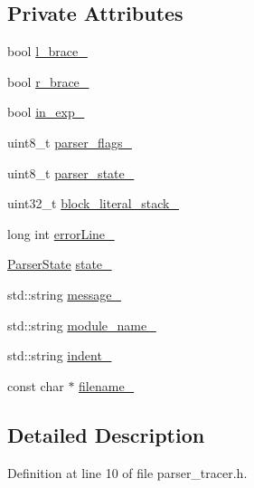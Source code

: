 \subsection*{Private Attributes}
\begin{DoxyCompactItemize}
\item 
bool \hyperlink{classmocha_1_1_parser_tracer_aff95ee8b66288b929029026324959be4}{l\_\-brace\_\-}
\item 
bool \hyperlink{classmocha_1_1_parser_tracer_a68ddbc5b5c22bd599d86ad7e82598a8d}{r\_\-brace\_\-}
\item 
bool \hyperlink{classmocha_1_1_parser_tracer_ab3d8cd46853e02d0318b932a4d2e271a}{in\_\-exp\_\-}
\item 
uint8\_\-t \hyperlink{classmocha_1_1_parser_tracer_a2b47370146eb41cae42152a5aec44aa9}{parser\_\-flags\_\-}
\item 
uint8\_\-t \hyperlink{classmocha_1_1_parser_tracer_a114c5f058d10f88c349347528ba60bfe}{parser\_\-state\_\-}
\item 
uint32\_\-t \hyperlink{classmocha_1_1_parser_tracer_a54822e9954907f16d56078e0339436fa}{block\_\-literal\_\-stack\_\-}
\item 
long int \hyperlink{classmocha_1_1_parser_tracer_a0d4c2ee1918d1e59ce45779853e462e5}{errorLine\_\-}
\item 
\hyperlink{classmocha_1_1_parser_tracer_afe3c94bff7f4cd17fd2f457f92fcf713}{ParserState} \hyperlink{classmocha_1_1_parser_tracer_a8663013c09f0c7788bc5a26715fdc746}{state\_\-}
\item 
std::string \hyperlink{classmocha_1_1_parser_tracer_a11ac093f19a1e36dd2386c423dc96d04}{message\_\-}
\item 
std::string \hyperlink{classmocha_1_1_parser_tracer_ab5d8b29a4acd4d80c83d3d7d5f70f4cf}{module\_\-name\_\-}
\item 
std::string \hyperlink{classmocha_1_1_parser_tracer_a423db07998b1298089cd5e6daa330d3b}{indent\_\-}
\item 
const char $\ast$ \hyperlink{classmocha_1_1_parser_tracer_ae45e8a1683a3ac121218fdad7b6b9bc2}{filename\_\-}
\end{DoxyCompactItemize}


\subsection{Detailed Description}


Definition at line 10 of file parser\_\-tracer.h.



